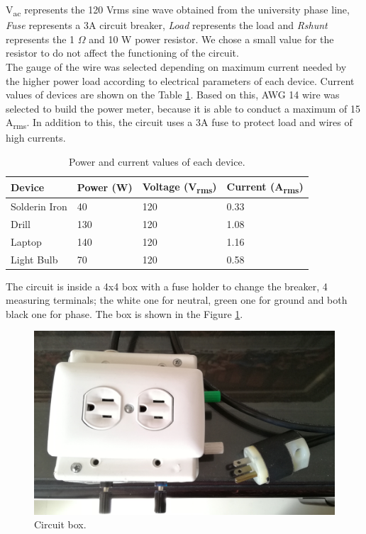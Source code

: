 \documentclass[journal]{IEEEtran}
\begin{document}
V\textsubscript{ac} represents the 120 Vrms sine wave 
obtained from the university phase line, \textit{Fuse}
represents a 3A circuit breaker, \textit{Load} represents 
the load and \textit{Rshunt} 
represents the 1 $\Omega$ and 10 W 
power resistor. We chose a small value for the resistor 
to do not affect the functioning of the circuit. \\

The gauge of the wire was selected depending on maximum 
current needed by the higher power load according to 
electrical parameters 
of each device. Current values of devices are 
shown on the Table \ref{current_table}. Based on this, 
AWG 14 wire was selected to build the power meter, because 
it is able to conduct a maximum of 15 A\textsubscript{rms}.
In addition to this, the circuit uses a 3A fuse to protect
load and wires of high currents.\\

\begin{table}
\centering
\caption{Power and current values of each device.}
\begin{tabular}{|l|p{1.2cm}|p{1.5cm}|p{1.5cm}|}
\hline 
Device & Power (W) & Voltage (V\textsubscript{rms}) 
& Current (A\textsubscript{rms}) \\ \hline 
Solderin Iron 	&  40	& 120 	& 0.33 \\ \hline 
Drill 		& 130	& 120   & 1.08 \\ \hline 
Laptop 		& 140 	& 120   & 1.16 \\ \hline 
Light Bulb		& 70  	& 120   & 0.58 \\ \hline 
\end{tabular}
\label{current_table}
\end{table}

The circuit is inside a 4x4 box with a fuse holder to 
change the breaker, 4 measuring terminals; the white 
one for neutral, green one for ground and 
both black one for phase. The box is shown in the 
Figure \ref{circuit_box}. \\

\begin{figure}[h]
\centering
\includegraphics[clip,width=0.8\columnwidth]{circuit_box.png}
\caption{Circuit box.}
\label{circuit_box}
\end{figure}
\end{document}
